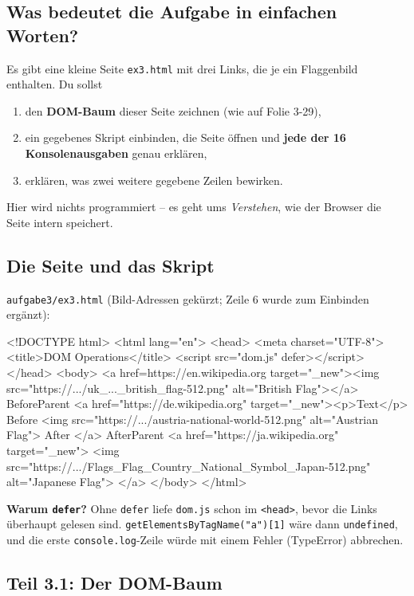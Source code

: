 \documentclass[a4paper,11pt]{article}
\begin{document}
\subsection{Was bedeutet die Aufgabe in einfachen Worten?}

Es gibt eine kleine Seite \texttt{ex3.html} mit drei Links, die je ein Flaggenbild enthalten. Du sollst
\begin{enumerate}[nosep]
\item[(1)] den \textbf{DOM-Baum} dieser Seite zeichnen (wie auf Folie 3-29),
\item[(2)] ein gegebenes Skript einbinden, die Seite öffnen und \textbf{jede der 16 Konsolenausgaben} genau erklären,
\item[(3)] erklären, was zwei weitere gegebene Zeilen bewirken.
\end{enumerate}
Hier wird nichts programmiert -- es geht ums \emph{Verstehen}, wie der Browser die Seite intern speichert.

\subsection{Die Seite und das Skript}

\texttt{aufgabe3/ex3.html} (Bild-Adressen gekürzt; Zeile 6 wurde zum Einbinden ergänzt):
\begin{htmlcode}
<!DOCTYPE html>
<html lang="en">
<head>
    <meta charset="UTF-8">
    <title>DOM Operations</title>
    <script src="dom.js" defer></script>
</head>
<body>
<a href=https://en.wikipedia.org target="_new"><img
        src="https://.../uk_..._british_flag-512.png" alt="British Flag"></a>
BeforeParent
<a href="https://de.wikipedia.org" target="_new"><p>Text</p>
    Before <img src="https://.../austria-national-world-512.png" alt="Austrian Flag">
    After
</a>
AfterParent
<a href="https://ja.wikipedia.org" target="_new">
    <img src="https://.../Flags_Flag_Country_National_Symbol_Japan-512.png" alt="Japanese Flag">
</a>
</body>
</html>
\end{htmlcode}

\textbf{Warum \texttt{defer}?} Ohne \texttt{defer} liefe \texttt{dom.js} schon im \texttt{<head>}, bevor die Links
überhaupt gelesen sind. \lstinline|getElementsByTagName("a")[1]| wäre dann \lstinline|undefined|, und die erste
\texttt{console.log}-Zeile würde mit einem Fehler (TypeError) abbrechen.

\subsection{Teil 3.1: Der DOM-Baum}
\end{document}
